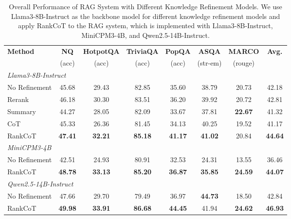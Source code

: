 \begin{table*}
  \centering
  \begin{tabular}{lccccccc}
    \hline
    \multirow{2}{*}{\textbf{Method}} & \textbf{NQ} & \textbf{HotpotQA} & \textbf{TriviaQA} & \textbf{PopQA} &\textbf{ASQA} &  \textbf{MARCO} &\textbf{Avg.} \\
    &{(acc)} &{(acc)} &{(acc)} &{(acc)} &{(str-em)} &{(rouge)}\\
    \hline
    \multicolumn{8}{l}{\textit{Llama3-8B-Instruct}} \\
    \hdashline
    No Refinement    &{45.68} & {29.43} & {82.85} &{35.60} & {38.79}  & {20.73} &{42.18}\\
    Rerank & {46.18} &{30.30} &{83.51}  &{36.20} &  {39.92} & {20.72} &{42.81}\\
    Summary     &{44.27} & {28.05} & {82.09} &{33.67} & {37.81} &\textbf{22.67} &{41.32}\\
    CoT   &{45.33} & {26.36} & {81.45} &{34.13}  &{40.25}   & {19.52} &{41.17}\\
    RankCoT  & \textbf{47.41} & \textbf{32.21} & \textbf{85.18} &\textbf{41.17} & \textbf{41.02}  &{20.84} &\textbf{44.64}\\
    \hline
    \multicolumn{8}{l}{\textit{MiniCPM3-4B}} \\
    \hdashline
    No Refinement    &{42.51} &{24.93} &{80.91} &{32.53} &{24.31}  & {13.55} &{36.46}\\
    RankCoT  & \textbf{48.78} & \textbf{33.13} & \textbf{85.20} &\textbf{36.87}  &\textbf{35.85} & \textbf{24.59} &\textbf{44.07}\\
    \hline
    \multicolumn{8}{l}{\textit{Qwen2.5-14B-Instruct}} \\
    \hdashline
    No Refinement    &{47.66} & {29.70} & {79.49} &{36.97} &\textbf{44.73} & {18.50} &{42.84}\\
    RankCoT  & \textbf{49.98} & \textbf{33.91} & \textbf{86.68} &\textbf{44.45}  & {41.94} & \textbf{24.62} &\textbf{46.93}\\
    \hline
  \end{tabular}
  \caption{\label{main result}
    Overall Performance of RAG System with Different Knowledge Refinement Models. We use Llama3-8B-Instruct as the backbone model for different knowledge refinement models and apply RankCoT to the RAG system, which is implemented with Llama3-8B-Instruct, MiniCPM3-4B, and Qwen2.5-14B-Instruct. 
  }
\end{table*}